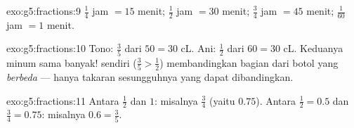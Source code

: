 \begin{solution}{exo:g5:fractions:9}
$\frac14$ jam $= 15$ menit; $\frac12$ jam $= 30$ menit; $\frac34$ jam
$= 45$ menit; $\frac{1}{60}$ jam $= 1$ menit.
\end{solution}

\begin{solution}{exo:g5:fractions:10}
Tono: $\frac35$ dari $50 = 30$ cL. Ani: $\frac12$ dari $60 = 30$ cL.
Keduanya minum sama banyak!  sendiri
($\frac35 > \frac12$) membandingkan bagian dari botol yang
\emph{berbeda} --- hanya takaran sesungguhnya yang dapat dibandingkan.
\end{solution}

\begin{solution}{exo:g5:fractions:11}
Antara $\frac12$ dan $1$: misalnya $\frac34$ (yaitu $0.75$). Antara
$\frac12 = 0.5$ dan $\frac34 = 0.75$: misalnya $0.6 =
\frac35$.

\end{solution}
